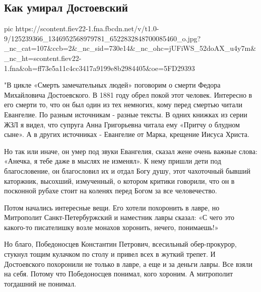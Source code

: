  
 
 

\subsection{Как умирал Достоевский}
\label{sec:13_11_2020.fb.evgeniy_maslov.1.dostoevskii_kak_umiral}

\ifcmt

pic https://scontent.fiev22-1.fna.fbcdn.net/v/t1.0-9/125239366_1346952568979781_6522832848700085460_o.jpg?_nc_cat=107&ccb=2&_nc_sid=730e14&_nc_ohc=jUFiWS_52doAX_u4y7m&_nc_ht=scontent.fiev22-1.fna&oh=ff73e5a11c4cc3417a9199e8b2984405&oe=5FD29393

\fi

"В цикле «Смерть замечательных людей» поговорим о смерти Федора Михайловича
Достоевского. В 1881 году обрел покой этот человек. Интересно в его смерти
то, что он был один из тех немногих, кому перед смертью читали Евангелие. По
разным источникам - разные тексты. В одних книжках из серии ЖЗЛ я видел, что
супруга Анна Григорьевна читала ему «Притчу о блудном сыне». А в других
источниках - Евангелие от Марка, крещение Иисуса Христа.

Но так или иначе, он умер под звуки Евангелия, сказал жене очень важные слова:
«Анечка, я тебе даже в мыслях не изменял». К нему пришли дети под
благословение, он благословил их и отдал Богу душу, этот чахоточный бывший
каторжник, высохший, измученный, о котором критики говорили, что он в посконной
рубахе стоит на коленях перед Богом за все человечество.

Потом начались интересные вещи. Его хотели похоронить в лавре, но Митрополит
Санкт-Петербуржский и наместник лавры сказал: «С чего это какого-то писателишку
возле монахов хоронить, нечего, понимаешь!»

Но благо, Победоносцев Константин Петрович, всесильный обер-прокурор, стукнул
тощим кулачком по столу и привел всех в жуткий трепет. И Достоевского
похоронили не только в лавре, а еще и за деньги лавры. Все взяли на себя.
Потому что Победоносцев понимал, кого хороним. А митрополит тогдашний не
понимал.


